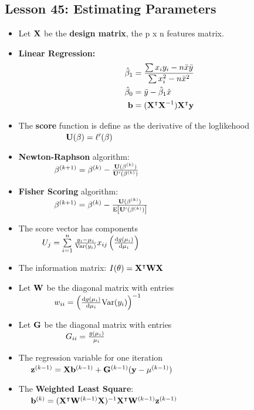 \documentclass[10pt, french]{article}
\begin{document}
\begin{multicols*}{3}
\section*{Lesson 45: Estimating Parameters}
\begin{itemize}[align=left,leftmargin=*]
  \item Let $\mathbf{X}$ be the \textbf{design matrix}, the p x n features matrix.
  \item \textbf{Linear Regression:} \\
  \begin{align*}
    \hat{\beta}_1 &= \frac{\sum x_iy_i - n\bar{x}\bar{y}}{\sum x_i^2 - n\bar{x}^2} \\
    \hat{\beta}_0 &= \bar{y} - \hat{\beta}_1 \hat{x} \\
    \mathbf{b} &= (\mathbf{X}^\intercal\mathbf{X}^{-1})\mathbf{X}^\intercal \mathbf{y}
  \end{align*}
  \item The \textbf{score} function is define as the derivative of the loglikehood \\
  $\hspace*{2cm} \mathbf{U}(\beta) = \ell'(\beta)$
  \item \textbf{Newton-Raphson} algorithm: \\
  $\hspace*{1.5cm} \beta^{(k+1)} =\beta^{(k)} - \frac{\mathbf{U}(\beta^{(k)})}{\mathbf{U}'(\beta^{(k)})}$
  \item \textbf{Fisher Scoring} algorithm:\\
  $\hspace*{1.5cm} \beta^{(k+1)} =\beta^{(k)} - \frac{\mathbf{U}(\beta^{(k)})}{\mathrm{E} {\left[ \mathbf{U}'(\beta^{(k)}) \right]}}$
  \item The score vector has components \\
  $\hspace*{1cm} U_j =\sum\limits_{i=1}^n \frac{y_i - \mu_i}{\mathrm{Var} {\left( y_i \right)}}x_{ij}\left( \frac{\mathop{}\!\mathrm{d} g(\mu_i)}{\mathop{}\!\mathrm{d} \mu_i}\right)$
  \item The information matrix: $I(\theta) = \mathbf{X}^\intercal\mathbf{W}\mathbf{X}$
  \item Let $\mathbf{W}$ be the diagonal matrix with entries \\
  $\hspace*{1.5cm}w_{ii} =\left( \frac{\mathop{}\!\mathrm{d} g(\mu_i)}{\mathop{}\!\mathrm{d}\mu_i} \mathrm{Var} {\left( y_i \right)}\right)^{-1}$
  \item Let $\mathbf{G}$ be the diagonal matrix with entries \\
  $\hspace*{2cm}G_{ii} =\frac{g(\mu_i)}{\mu_i}$
  \item The regression variable for one iteration \\
  $\hspace*{0.5cm}\mathbf{z}^{(k-1)}= \mathbf{X}\mathbf{b}^{(k-1)} + \mathbf{G}^{(k-1)}(\mathbf{y} - \mathbf{\mu}^{(k-1)})$
  \item The \textbf{Weighted Least Square}: \\
  $\hspace*{0.5cm} \mathbf{b}^{(k)} = (\mathbf{X}^\intercal\mathbf{W}^{(k-1)}\mathbf{X})^{-1}\mathbf{X}^\intercal\mathbf{W}^{(k-1)}\mathbf{z}^{(k-1)}$
\end{itemize}


\end{multicols*}
\end{document}
